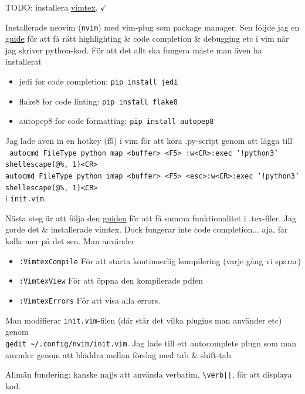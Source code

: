 TODO: installera \href{https://awesomeopensource.com/project/lervag/vimtex?categoryPage=4}{\color{blue}vimtex}. $\checkmark$

Installerade neovim (\verb|nvim|) med vim-plug som package manager. Sen följde jag en \href{https://yufanlu.net/2018/09/03/neovim-python/}{\color{blue}guide} för att få rätt highlighting \& code completion \& debugging etc i vim när jag skriver python-kod. För att det allt ska fungera måste man även ha installerat
\begin{itemize}
    \item jedi for code completion: \verb|pip install jedi|
    \item flake8 for code linting: \verb|pip install flake8|
    \item autopep8 for code formatting: \verb|pip install autopep8|
\end{itemize}
Jag lade även in en hotkey (f5) i vim för att köra .py-script genom att lägga till\\
\texttt{
    autocmd FileType python map <buffer> <F5> :w<CR>:exec '!python3'\\ shellescape(@\%, 1)<CR>\\
    autocmd FileType python imap <buffer> <F5> <esc>:w<CR>:exec '!python3'\\ shellescape(@\%, 1)<CR>
}\\
i \verb|init.vim|.

Nästa steg är att följa den \href{https://yufanlu.net/2018/09/03/neovim-latex/}{\color{blue}guiden} för att få samma funktionalitet i .tex-filer. Jag gorde det \& installerade vimtex. Dock fungerar inte code completion... aja, får kolla mer på det sen. Man använder
\begin{itemize}
    \item \verb|:VimtexCompile| För att starta kontinuerlig kompilering (varje gång vi sparar)
    \item \verb|:VimtexView| För att öppna den kompilerade pdfen
    \item \verb|:VimtexErrors| För att visa alla errors.
\end{itemize}
Man modifierar \verb|init.vim|-filen (där står det vilka plugins man använder etc) genom\\ \verb|gedit ~/.config/nvim/init.vim|. Jag lade till ett autocomplete plugn som man anvnder genom att bläddra mellan förslag med tab \& shift-tab.


\bigskip

Allmän fundering: kanske najjs att använda verbatim, \verb+\verb||+, för att displaya kod.

